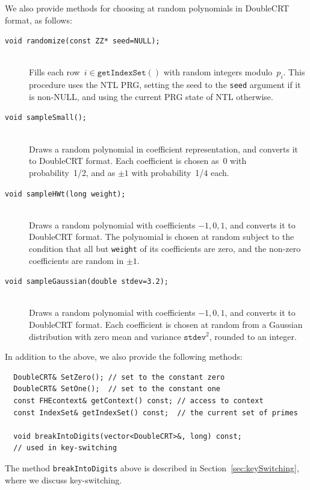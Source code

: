 \documentclass[14pt]{extarticle}
\newcommand{\shaisays}[1]{$\ll$\textsf{#1 Shai}$\gg$}
\newcommand{\secref}[1]{Section~\protect\ref{sec:#1}}
\def\DoubleCRT{\textsf{DoubleCRT}}
\begin{document}
\noindent
We also provide methods for choosing at random polynomials in
{\DoubleCRT} format, as follows:

\begin{description}
\item[\texttt{void randomize(const ZZ* seed=NULL);}]\ \\
Fills each row~$i\in\mathtt{getIndexSet()}$ with random integers 
modulo~$p_i$. This procedure uses the NTL PRG, setting the seed
to the \texttt{seed} argument if it is non-NULL, and using the
current PRG state of NTL otherwise.

\item[\texttt{void sampleSmall();}]\ \\
Draws a random polynomial in coefficient representation, and converts
it to {\DoubleCRT} format. Each coefficient is chosen as~0 with
probability~1/2,  and as $\pm 1$ with probability~1/4 each.


\item[\texttt{void sampleHWt(long weight);}]\ \\
Draws a random polynomial with coefficients $-1,0,1$, and converts
it to {\DoubleCRT} format. The polynomial is chosen at random subject
to the condition that all but \texttt{weight} of its coefficients
are zero, and the non-zero coefficients are random in $\pm 1$.

\item[\texttt{void sampleGaussian(double stdev=3.2);}]\ \\
Draws a random polynomial with coefficients $-1,0,1$, and converts
it to {\DoubleCRT} format. Each coefficient is chosen at random from
a Gaussian distribution with zero mean and variance $\mathtt{stdev}^2$,
rounded to an integer.
\end{description}

\noindent
In addition to the above, we also provide the following methods:
\begin{verbatim}
  DoubleCRT& SetZero(); // set to the constant zero
  DoubleCRT& SetOne();  // set to the constant one
  const FHEcontext& getContext() const; // access to context
  const IndexSet& getIndexSet() const;  // the current set of primes

  void breakIntoDigits(vector<DoubleCRT>&, long) const; 
  // used in key-switching
\end{verbatim}
The method \texttt{breakIntoDigits} above is described in
\secref{keySwitching}, where we discuss key-switching.
\end{document}
